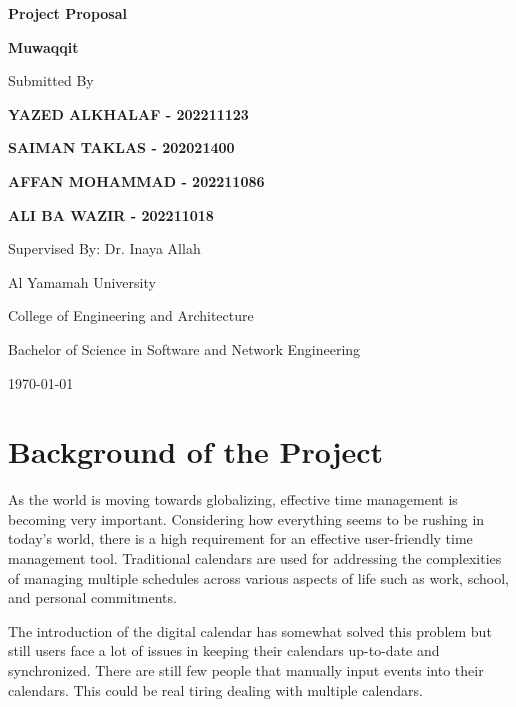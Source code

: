 \documentclass[12pt,a4paper]{article}
\begin{document}
\begin{titlepage}
\begin{center}
\vspace*{2cm}
{\huge\bfseries Project Proposal\par}
\vspace{1.5cm}
{\Large\bfseries Muwaqqit\par}
\vspace{2cm}
{\Large Submitted By\par}
\vspace{1cm}
{\Large\bfseries YAZED ALKHALAF - 202211123\par}
{\Large\bfseries SAIMAN TAKLAS - 202021400\par}
{\Large\bfseries AFFAN MOHAMMAD - 202211086\par}
{\Large\bfseries ALI BA WAZIR - 202211018\par}
\vfill
{\Large Supervised By: Dr. Inaya Allah\par}
\vspace{1cm}
{\Large Al Yamamah University\par}
{\Large College of Engineering and Architecture\par}
{\Large Bachelor of Science in Software and Network Engineering\par}
\vspace{1cm}
{\Large \today\par}
\end{center}
\end{titlepage}

\tableofcontents
\clearpage

\doublespacing

\section{Background of the Project}

As the world is moving towards globalizing, effective time management is becoming very important. Considering how everything seems to be rushing in today's world, there is a high requirement for an effective user-friendly time management tool. Traditional calendars are used for addressing the complexities of managing multiple schedules across various aspects of life such as work, school, and personal commitments.

The introduction of the digital calendar has somewhat solved this problem but still users face a lot of issues in keeping their calendars up-to-date and synchronized. There are still few people that manually input events into their calendars. This could be real tiring dealing with multiple calendars.
\end{document}

